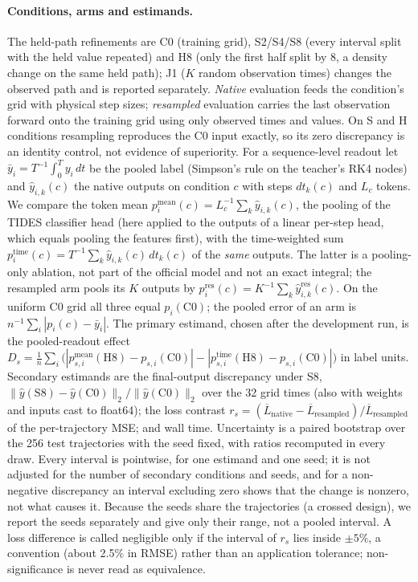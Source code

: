 \documentclass{article}
\theoremstyle{plain}
\theoremstyle{definition}
\theoremstyle{remark}
\begin{document}
\paragraph{Conditions, arms and estimands.}
The held-path refinements are C0 (training grid), S2/S4/S8 (every interval split with the held value repeated) and H8 (only the first half split by 8, a density change on the same held path); J1 ($K$ random observation times) changes the observed path and is reported separately.
\emph{Native} evaluation feeds the condition's grid with physical step sizes; \emph{resampled} evaluation carries the last observation forward onto the training grid using only observed times and values.
On S and H conditions resampling reproduces the C0 input exactly, so its zero discrepancy is an identity control, not evidence of superiority.
For a sequence-level readout let $\bar y_i=T^{-1}\!\int_0^Ty_i\,dt$ be the pooled label (Simpson's rule on the teacher's RK4 nodes) and $\hat y_{i,k}(c)$ the native outputs on condition $c$ with steps $dt_k(c)$ and $L_c$ tokens.
We compare the token mean $p^{\mathrm{mean}}_i(c)=L_c^{-1}\sum_k\hat y_{i,k}(c)$, the pooling of the TIDES classifier head (here applied to the outputs of a linear per-step head, which equals pooling the features first), with the time-weighted sum $p^{\mathrm{time}}_i(c)=T^{-1}\sum_k\hat y_{i,k}(c)\,dt_k(c)$ of the \emph{same} outputs.
The latter is a pooling-only ablation, not part of the official model and not an exact integral; the resampled arm pools its $K$ outputs by $p^{\mathrm{res}}_i(c)=K^{-1}\sum_k\hat y^{\mathrm{res}}_{i,k}(c)$. On the uniform C0 grid all three equal $p_i(\mathrm{C0})$; the pooled error of an arm is $n^{-1}\sum_i|p_i(c)-\bar y_i|$.
The primary estimand, chosen after the development run, is the pooled-readout effect
$D_s=\frac1n\sum_i\big(|p^{\mathrm{mean}}_{s,i}(\mathrm{H8})-p_{s,i}(\mathrm{C0})|-|p^{\mathrm{time}}_{s,i}(\mathrm{H8})-p_{s,i}(\mathrm{C0})|\big)$ in label units.
Secondary estimands are the final-output discrepancy under S8, $\|\hat y(\mathrm{S8})-\hat y(\mathrm{C0})\|_2/\|\hat y(\mathrm{C0})\|_2$ over the 32 grid times (also with weights and inputs cast to float64); the loss contrast $r_s=(\overline L_{\mathrm{native}}-\overline L_{\mathrm{resampled}})/\overline L_{\mathrm{resampled}}$ of the per-trajectory MSE; and wall time.
Uncertainty is a paired bootstrap over the 256 test trajectories with the seed fixed, with ratios recomputed in every draw.
Every interval is pointwise, for one estimand and one seed; it is not adjusted for the number of secondary conditions and seeds, and for a non-negative discrepancy an interval excluding zero shows that the change is nonzero, not what causes it.
Because the seeds share the trajectories (a crossed design), we report the seeds separately and give only their range, not a pooled interval.
A loss difference is called negligible only if the interval of $r_s$ lies inside $\pm5\%$, a convention (about 2.5\% in RMSE) rather than an application tolerance; non-significance is never read as equivalence.
\end{document}
